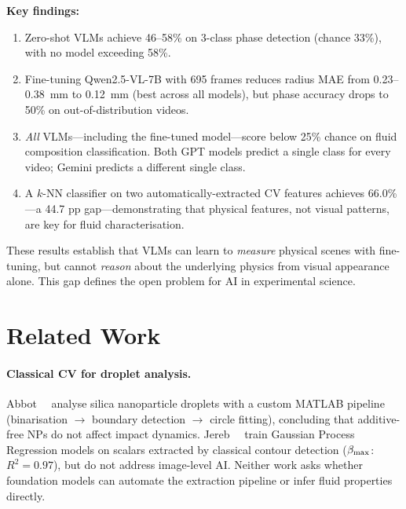 \documentclass[10pt,twocolumn,letterpaper]{article}
\begin{document}
\noindent\textbf{Key findings:}
\begin{enumerate}[leftmargin=*, topsep=2pt, itemsep=1pt]
  \item Zero-shot VLMs achieve 46–58\% on 3-class phase detection (chance
    33\%), with no model exceeding 58\%.
  \item Fine-tuning Qwen2.5-VL-7B with 695 frames reduces radius MAE from
    0.23–0.38~mm to 0.12~mm (best across all models), but phase accuracy
    drops to 50\% on out-of-distribution videos.
  \item \emph{All} VLMs—including the fine-tuned model—score below 25\% chance
    on fluid composition classification. Both GPT models predict a single class
    for every video; Gemini predicts a different single class.
  \item A $k$-NN classifier on two automatically-extracted CV features achieves
    66.0\%—a 44.7 pp gap—demonstrating that physical features, not visual
    patterns, are key for fluid characterisation.
\end{enumerate}

These results establish that VLMs can learn to \emph{measure} physical scenes
with fine-tuning, but cannot \emph{reason} about the underlying physics from
visual appearance alone.
This gap defines the open problem for AI in experimental science.

\section{Related Work}
\label{sec:related}

\paragraph{Classical CV for droplet analysis.}
Abbot~\etal~\cite{abbot2025nanoparticles} analyse silica nanoparticle droplets
with a custom MATLAB pipeline (binarisation $\to$ boundary detection $\to$
circle fitting), concluding that additive-free NPs do not affect impact dynamics.
Jereb~\etal~\cite{jereb2025droplet} train Gaussian Process Regression models
on scalars extracted by classical contour detection ($\beta_{\max}$: $R^2{=}0.97$),
but do not address image-level AI. Neither work asks whether foundation models
can automate the extraction pipeline or infer fluid properties directly.
\end{document}
